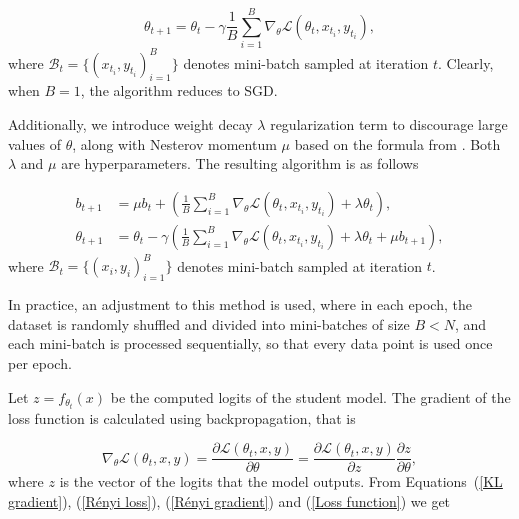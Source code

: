 \begin{equation*}
	\theta_{t+1} = \theta_t - \gamma \frac{1}{B} \sum_{i=1}^{B} \nabla_\theta \mathcal{L}(\theta_t,x_{t_i},y_{t_i}),
\end{equation*}
where $\mathcal{B}_t = \{(x_{t_i},y_{t_i})_{i=1}^B\}$ denotes mini-batch sampled at iteration $t$. Clearly, when $B = 1$, the algorithm reduces to SGD.

Additionally, we introduce weight decay $\lambda$ regularization term to discourage large values of $\theta$, along with Nesterov momentum $\mu$ based on the formula from \cite{Sutskever2013}. Both $\lambda$ and $\mu$ are hyperparameters. The resulting algorithm is as follows

\begin{equation*}
	\begin{aligned}
		b_{t+1} &= \mu b_t + \left( \frac{1}{B} \sum_{i=1}^{B} \nabla_\theta \mathcal{L}(\theta_t,x_{t_i},y_{t_i}) + \lambda \theta_t \right), \\
		\theta_{t+1} &= \theta_t - \gamma \left( \frac{1}{B} \sum_{i=1}^{B} \nabla_\theta \mathcal{L}(\theta_t,x_{t_i},y_{t_i}) + \lambda \theta_t + \mu b_{t+1} \right),
	\end{aligned}
\end{equation*}
where $\mathcal{B}_t = \{(x_i,y_i)_{i=1}^B\}$ denotes mini-batch sampled at iteration $t$.

In practice, an adjustment to this method is used, where in each epoch, the dataset is randomly shuffled and divided into mini-batches of size $B < N$, and each mini-batch is processed sequentially, so that every data point is used once per epoch.

Let $z=f_{\theta_t} (x)$ be the computed logits of the student model. The gradient of the loss function is calculated using backpropagation, that is

\begin{equation*}
	\nabla_\theta \mathcal{L}(\theta_t,x,y) = \frac{\partial \mathcal{L}(\theta_t,x,y)}{\partial \theta} = \frac{\partial \mathcal{L}(\theta_t,x,y)}{\partial z} \frac{\partial z}{\partial \theta},
\end{equation*}
where $z$ is the vector of the logits that the model outputs. From Equations~(\ref{KL gradient}), (\ref{Rényi loss}), (\ref{Rényi gradient}) and (\ref{Loss function}) we get

